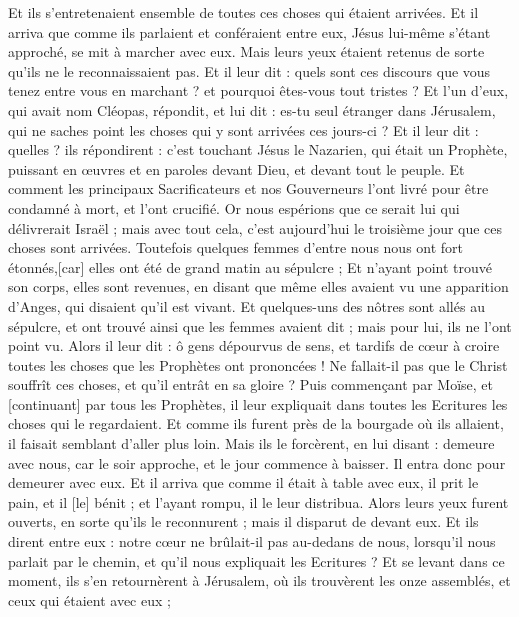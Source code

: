 \begin{multicols}{2}
Et ils s'entretenaient ensemble de toutes ces choses qui étaient arrivées.
Et il arriva que comme ils parlaient et conféraient entre eux, Jésus lui-même s'étant approché, se mit à marcher avec eux.
Mais leurs yeux étaient retenus de sorte qu'ils ne le reconnaissaient pas.
Et il leur dit : quels sont ces discours que vous tenez entre vous en marchant ? et pourquoi êtes-vous tout tristes ?
Et l'un d'eux, qui avait nom Cléopas, répondit, et lui dit : es-tu seul étranger dans Jérusalem, qui ne saches point les choses qui y sont arrivées ces jours-ci ?
Et il leur dit : quelles ? ils répondirent : c'est touchant Jésus le Nazarien, qui était un Prophète, puissant en œuvres et en paroles devant Dieu, et devant tout le peuple.
Et comment les principaux Sacrificateurs et nos Gouverneurs l'ont livré pour être condamné à mort, et l'ont crucifié.
Or nous espérions que ce serait lui qui délivrerait Israël ; mais avec tout cela, c'est aujourd'hui le troisième jour que ces choses sont arrivées.
Toutefois quelques femmes d'entre nous nous ont fort étonnés,[car] elles ont été de grand matin au sépulcre ;
Et n'ayant point trouvé son corps, elles sont revenues, en disant que même elles avaient vu une apparition d'Anges, qui disaient qu'il est vivant.
Et quelques-uns des nôtres sont allés au sépulcre, et ont trouvé ainsi que les femmes avaient dit ; mais pour lui, ils ne l'ont point vu.
Alors il leur dit : ô gens dépourvus de sens, et tardifs de cœur à croire toutes les choses que les Prophètes ont prononcées !
Ne fallait-il pas que le Christ souffrît ces choses, et qu'il entrât en sa gloire ?
Puis commençant par Moïse, et [continuant] par tous les Prophètes, il leur expliquait dans toutes les Ecritures les choses qui le regardaient.
Et comme ils furent près de la bourgade où ils allaient, il faisait semblant d'aller plus loin.
Mais ils le forcèrent, en lui disant : demeure avec nous, car le soir approche, et le jour commence à baisser. Il entra donc pour demeurer avec eux.
Et il arriva que comme il était à table avec eux, il prit le pain, et il [le] bénit ; et l'ayant rompu, il le leur distribua.
Alors leurs yeux furent ouverts, en sorte qu'ils le reconnurent ; mais il disparut de devant eux.
Et ils dirent entre eux : notre cœur ne brûlait-il pas au-dedans de nous, lorsqu'il nous parlait par le chemin, et qu'il nous expliquait les Ecritures ?
Et se levant dans ce moment, ils s'en retournèrent à Jérusalem, où ils trouvèrent les onze assemblés, et ceux qui étaient avec eux ;

\end{multicols}
